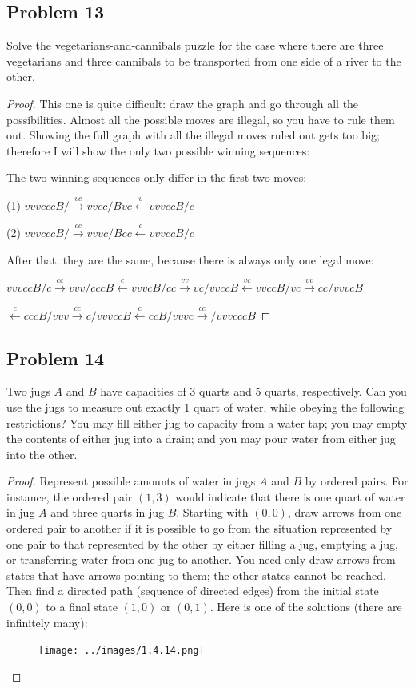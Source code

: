 \documentclass[14pt]{extarticle}
\newcommand{\from}{\leftarrow}
\begin{document}
\subsection{Problem 13}
Solve the vegetarians-and-cannibals puzzle for the case where there are three
vegetarians and three cannibals to be transported from one side of a river to
the other.

\begin{proof}
This one is quite difficult: draw the graph and go through all the
possibilities. Almost all the possible moves are illegal, so you have to rule
them out. Showing the full graph with all the illegal moves ruled out gets too
big; therefore I will show the only two possible winning sequences:

The two winning sequences only differ in the first two moves:

(1) $vvvcccB/ \overset{vc}{\to} vvcc/Bvc \overset{v}{\from} vvvccB/c$

(2) $vvvcccB/ \overset{cc}{\to} vvvc/Bcc \overset{c}{\from} vvvccB/c$

After that, they are the same, because there is always only one legal move:

$
vvvccB/c \overset{cc}{\to} vvv/cccB \overset{c}{\from} vvvcB/cc
\overset{vv}{\to} vc/vvccB \overset{vc}{\from} vvccB/vc \overset{vv}{\to}
cc/vvvcB$

$\overset{c}{\from} cccB/vvv \overset{cc}{\to} c/vvvccB
\overset{c}{\from} ccB/vvvc \overset{cc}{\to} /vvvcccB$

\end{proof}

\subsection{Problem 14}
Two jugs $A$ and $B$ have capacities of 3 quarts and 5 quarts, respectively.
Can you use the jugs to measure out exactly 1 quart of water, while obeying the
following restrictions? You may fill either jug to capacity from a water tap;
you may empty the contents of either jug into a drain; and you may pour water
from either jug into the other.

\begin{proof}
Represent possible amounts of water in jugs $A$ and $B$ by ordered
pairs. For instance, the ordered pair $(1, 3)$ would indicate that there
is one quart of water in jug $A$ and three quarts in jug $B$. Starting with
$(0, 0)$, draw arrows from one ordered pair to another if it is possible to go
from the situation represented by one pair to that represented by the other by
either filling a jug, emptying a jug, or transferring water from one jug to
another. You need only draw arrows from states that have arrows pointing to
them; the other states cannot be reached. Then find a directed path (sequence of
directed edges) from the initial state $(0, 0)$ to a final state $(1, 0)$ or
$(0, 1)$. Here is one of the solutions (there are infinitely many):

\begin{figure}[ht!]
\centering
\texttt{[image: ../images/1.4.14.png]}
\end{figure}
\end{proof}
\end{document}
